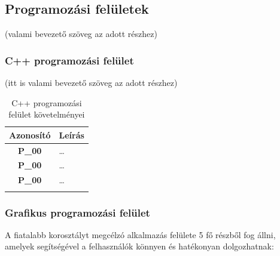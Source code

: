 \documentclass{article}
\begin{document}
\subsection{Programozási felületek}

(valami bevezető szöveg az adott részhez)

\subsubsection{C++ programozási felület}

(itt is valami bevezető szöveg az adott részhez)

\begingroup
\centering
\begin{longtable}{|c|p{14cm}|}
\hline
\textbf{Azonosító} & \textbf{Leírás}        \\ 
\hline
       \textbf{P\_00}  & … \\\hline
       \textbf{P\_00}  & … \\\hline
       \textbf{P\_00}  & … \\\hline
\hline
\caption{C++ programozási felület követelményei}
\end{longtable}
\endgroup


\subsubsection{Grafikus programozási felület}

A fiatalabb korosztályt megcélzó alkalmazás felülete 5 fő részből fog állni, amelyek segítségével a felhasználók könnyen és hatékonyan dolgozhatnak:
\end{document}
